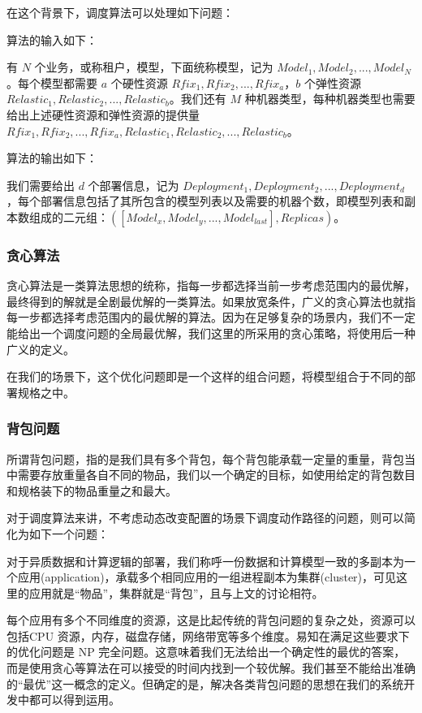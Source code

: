 在这个背景下，调度算法可以处理如下问题：

算法的输入如下：

有 $N$ 个业务，或称租户，模型，下面统称模型，记为 $Model_1,Model_2,...,Model_N$。每个模型都需要 $a$ 个硬性资源 $Rfix_1,Rfix_2,...,Rfix_a$，$b$ 个弹性资源 $Relastic_1,Relastic_2,...,Relastic_b$。我们还有 $M$ 种机器类型，每种机器类型也需要给出上述硬性资源和弹性资源的提供量 $Rfix_1,Rfix_2,...,Rfix_a,Relastic_1,Relastic_2,...,Relastic_b$。

算法的输出如下：

我们需要给出 $d$ 个部署信息，记为 $Deployment_1,Deployment_2,...,Deployment_d$，每个部署信息包括了其所包含的模型列表以及需要的机器个数，即模型列表和副本数组成的二元组：$([Model_x,Model_y,...,Model_{last}],Replicas)$。

\subsubsection{贪心算法}

贪心算法是一类算法思想的统称，指每一步都选择当前一步考虑范围内的最优解，最终得到的解就是全剧最优解的一类算法。如果放宽条件，广义的贪心算法也就指每一步都选择考虑范围内的最优解的算法。因为在足够复杂的场景内，我们不一定能给出一个调度问题的全局最优解，我们这里的所采用的贪心策略，将使用后一种广义的定义。

在我们的场景下，这个优化问题即是一个这样的组合问题，将模型组合于不同的部署规格之中。

\subsubsection{背包问题}

所谓背包问题，指的是我们具有多个背包，每个背包能承载一定量的重量，背包当中需要存放重量各自不同的物品，我们以一个确定的目标，如使用给定的背包数目和规格装下的物品重量之和最大。

对于调度算法来讲，不考虑动态改变配置的场景下调度动作路径的问题，则可以简化为如下一个问题：

对于异质数据和计算逻辑的部署，我们称呼一份数据和计算模型一致的多副本为一个应用(application)，承载多个相同应用的一组进程副本为集群(cluster)，可见这里的应用就是“物品”，集群就是“背包”，且与上文的讨论相符。

每个应用有多个不同维度的资源，这是比起传统的背包问题的复杂之处，资源可以包括CPU 资源，内存，磁盘存储，网络带宽等多个维度。易知在满足这些要求下的优化问题是 NP 完全问题。这意味着我们无法给出一个确定性的最优的答案，而是使用贪心等算法在可以接受的时间内找到一个较优解。我们甚至不能给出准确的“最优”这一概念的定义。但确定的是，解决各类背包问题的思想在我们的系统开发中都可以得到运用。

